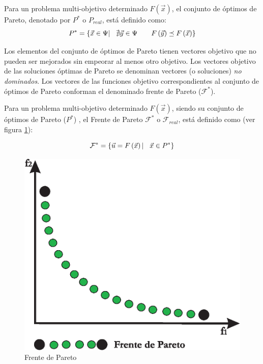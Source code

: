       \begin{definicion}
	Para un problema multi-objetivo determinado $F\left(\vec{x}\right)$, el conjunto de \'optimos de Pareto, denotado por $P^*$ 
	o $P_{real}$, est\'a definido como:	
	\[
	P^*= \left\{ \vec{x} \in \Psi |\hspace{0.3cm} \nexists \vec{y}\in \Psi \hspace{0.7cm} F\left(\vec{y}\right)\preceq F\left(\vec{x}\right) \right\}\]
      \end{definicion}
      
      Los elementos del conjunto de \'optimos de Pareto tienen vectores objetivo que no pueden ser mejorados sin empeorar al menos otro
      objetivo. Los vectores objetivo de las soluciones \'optimas de Pareto se denominan vectores (o soluciones) \textit{no dominados}.
      Los vectores de las funciones objetivo correspondientes al conjunto de \'optimos de Pareto conforman el denominado frente de Pareto 
      ($\mathcal{F}^*$).
      
      \begin{definicion}
      Para un problema multi-objetivo determinado $F\left(\vec{x} \right)$, siendo su conjunto de \'optimos de Pareto ($P^*$) , el Frente 
      de Pareto $\mathcal{F}^*$ o $\mathcal{F}_{real}$, est\'a definido como (ver figura \ref{fig:pareto}):
      
	  \[\mathcal{F}^*=\left\{ \vec{u} = F\left(\vec{x}\right) | \hspace{0.3cm} \vec{x}\in P^*\right\}\]
      \end{definicion}
      
      \begin{figure}
	\centering
	\includegraphics[scale=0.65]{Cap2/1-2.eps}
	  \caption{Frente de Pareto}
      \label{fig:pareto}
      \end{figure}
      

